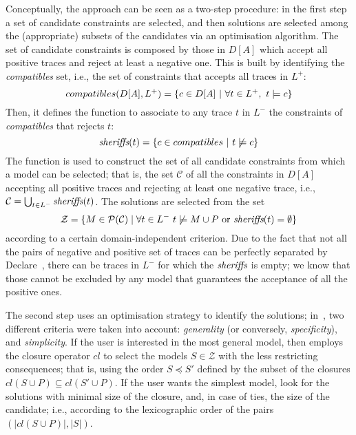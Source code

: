 Conceptually, the \nd approach can be seen as a two-step procedure: in the first step a set of candidate constraints are selected, and then solutions are selected among the (appropriate) subsets of the candidates via an optimisation algorithm.
%
The set of candidate constraints is composed by those in $D[A]$ which accept all positive traces and reject at least a negative one. This is built by identifying the \emph{compatibles} set, i.e., the set of constraints that accepts all traces in $L^+$: 
\begin{equation}
{compatibles(D[A], L^+)} = \{c\in D[A]~|~\forall t\in L^+,~ t\models c \} \\
\end{equation}
%
Then, it defines the \textit{\sheriff} function to associate to any trace $t$ in $L^-$ the constraints of \textit{compatibles} that rejects $t$:
\begin{equation}
{\textit{sheriffs}}(t) = \{c\in {compatibles}~|~t\not\models c\} \\
\end{equation}
%
The \textit{\sheriff} function is used to construct the set of all candidate constraints from which a model can be selected; that is, the set $\mathcal{C}$ of all the constraints in $D[A]$ accepting all positive traces and rejecting at least one negative trace, i.e., $\mathcal{C} = \bigcup_{t\in L^-} \textit{sheriffs}(t)$. The solutions are selected from the set 
\begin{equation}
  \mathcal{Z}=\{M\in\mathcal{P}(\mathcal{C})\mid \forall t\in L^-~t\not\models M\cup P \text{ or } {\textit{sheriffs}}(t) = \emptyset \}
\end{equation}
according to a certain domain-independent criterion. Due to the fact that not all the pairs of negative and positive set of traces can be perfectly separated by Declare~\cite{DBLP:conf/bpm/SlaatsDB21}, there can be traces in $L^-$ for which the ${\textit{sheriffs}}$ is empty; we know that those cannot be excluded by any model that guarantees the acceptance of all the positive ones.

The second step uses an optimisation strategy to identify the solutions; in~\cite{deviant-tkde}, two different criteria were taken into account: \emph{generality} (or conversely, \emph{specificity}), and \emph{simplicity}.
If the user is interested in the most general model, then \nd employs the closure operator $cl$ to select the models $S \in \mathcal{Z}$ with the less restricting consequences; that is, using the order $S\preceq S'$ defined by the subset of the closures $cl(S\cup P)\subseteq cl(S'\cup P)$.
If the user wants the simplest model, \nd look for the solutions with minimal size of the closure, and, in case of ties, the size of the candidate; i.e., according to the lexicographic order of the pairs $(|cl(S\cup P)|, |S|)$.



